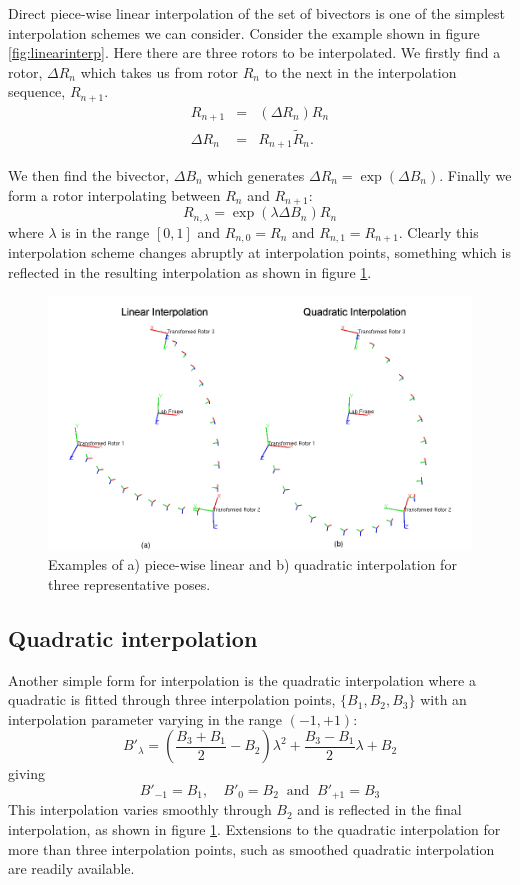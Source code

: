 Direct piece-wise linear interpolation of the set of bivectors is one of the simplest interpolation
schemes we can consider. Consider the example shown in figure \ref{fig:linearinterp}. Here there are
three rotors to be interpolated. We firstly find a rotor, $\Delta R_n$ which takes us from 
rotor $R_n$ to the next in the interpolation sequence, $R_{n+1}$.
\begin{eqnarray*}
R_{n+1} & = & (\Delta R_n) R_n\\
\Delta R_n & = & R_{n+1} \tilde{R}_n.
\end{eqnarray*}

We then find the bivector, $\Delta B_n$ which generates $\Delta R_n = \exp(\Delta B_n)$. Finally we
form a rotor interpolating between $R_n$  and $R_{n+1}$:
\[
R_{n,\lambda} = \exp(\lambda \Delta B_n)R_n
\]
where $\lambda$ is in the range $[0,1]$ and $R_{n,0} = R_n$ and $R_{n,1} = R_{n+1}$.
Clearly this interpolation scheme changes abruptly at interpolation points, something which is
reflected in the resulting interpolation as shown in figure \ref{fig:interp}.

\begin{figure}\centering
\includegraphics[width=\columnwidth]{interp}
\caption{\label{fig:interp}Examples of a) piece-wise linear and b) quadratic interpolation for
three representative poses.}
\end{figure}

\subsection{Quadratic interpolation}

Another simple form for interpolation is the quadratic interpolation where a quadratic 
is fitted through three interpolation points, $\{B_1, B_2, B_3\}$ with an interpolation
parameter varying in the range $(-1,+1)$:
\[
B'_\lambda = \left(\frac{B_3 + B_1}{2} - B_2\right)\lambda^2 + \frac{B_3 - B_1}{2}\lambda + B_2
\]
giving
\[
B'_{-1} = B_1,\quad B'_{0}=B_2\ \mbox{ and }\ B'_{+1} = B_3
\]
This interpolation varies smoothly through $B_2$ and is reflected in the final
interpolation, as shown in figure \ref{fig:interp}. Extensions to the quadratic
interpolation for more than three interpolation points, such as smoothed
quadratic interpolation \cite{cendes} are readily available.

